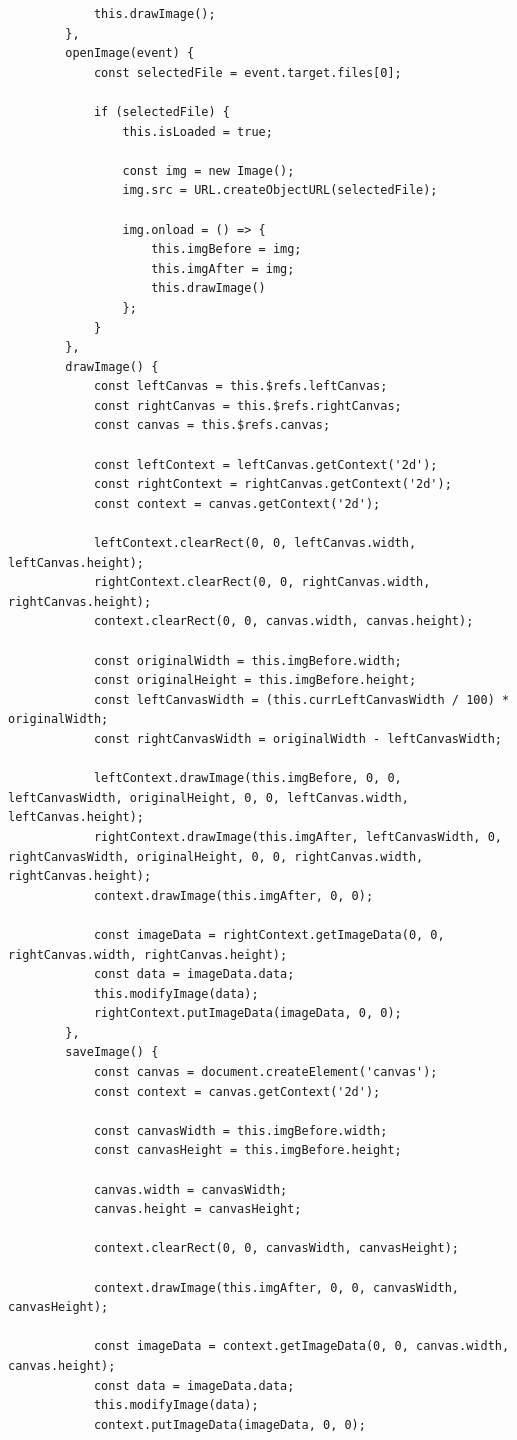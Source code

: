 \documentclass[oneside,14pt]{extarticle}
\begin{document}
\begin{normalsize}
\begin{tiny}
\begin{lstlisting}
			this.drawImage();
		},
		openImage(event) {      
			const selectedFile = event.target.files[0];
			
			if (selectedFile) {
				this.isLoaded = true;
				
				const img = new Image();
				img.src = URL.createObjectURL(selectedFile);
				
				img.onload = () => {
					this.imgBefore = img;
					this.imgAfter = img;
					this.drawImage()
				};
			}
		},
		drawImage() {
			const leftCanvas = this.$refs.leftCanvas;
			const rightCanvas = this.$refs.rightCanvas;
			const canvas = this.$refs.canvas;
			
			const leftContext = leftCanvas.getContext('2d');
			const rightContext = rightCanvas.getContext('2d');
			const context = canvas.getContext('2d');
			
			leftContext.clearRect(0, 0, leftCanvas.width, leftCanvas.height);
			rightContext.clearRect(0, 0, rightCanvas.width, rightCanvas.height);
			context.clearRect(0, 0, canvas.width, canvas.height);
			
			const originalWidth = this.imgBefore.width;
			const originalHeight = this.imgBefore.height;
			const leftCanvasWidth = (this.currLeftCanvasWidth / 100) * originalWidth;
			const rightCanvasWidth = originalWidth - leftCanvasWidth;
			
			leftContext.drawImage(this.imgBefore, 0, 0, leftCanvasWidth, originalHeight, 0, 0, leftCanvas.width, leftCanvas.height);
			rightContext.drawImage(this.imgAfter, leftCanvasWidth, 0, rightCanvasWidth, originalHeight, 0, 0, rightCanvas.width, rightCanvas.height);
			context.drawImage(this.imgAfter, 0, 0);
			
			const imageData = rightContext.getImageData(0, 0, rightCanvas.width, rightCanvas.height);
			const data = imageData.data;
			this.modifyImage(data);
			rightContext.putImageData(imageData, 0, 0);
		},
		saveImage() {
			const canvas = document.createElement('canvas');
			const context = canvas.getContext('2d');
			
			const canvasWidth = this.imgBefore.width;
			const canvasHeight = this.imgBefore.height;
			
			canvas.width = canvasWidth;
			canvas.height = canvasHeight;
			
			context.clearRect(0, 0, canvasWidth, canvasHeight);
			
			context.drawImage(this.imgAfter, 0, 0, canvasWidth, canvasHeight);
			
			const imageData = context.getImageData(0, 0, canvas.width, canvas.height);
			const data = imageData.data;
			this.modifyImage(data);
			context.putImageData(imageData, 0, 0);
			

\end{lstlisting}
\end{tiny}
\end{normalsize}
\end{document}

